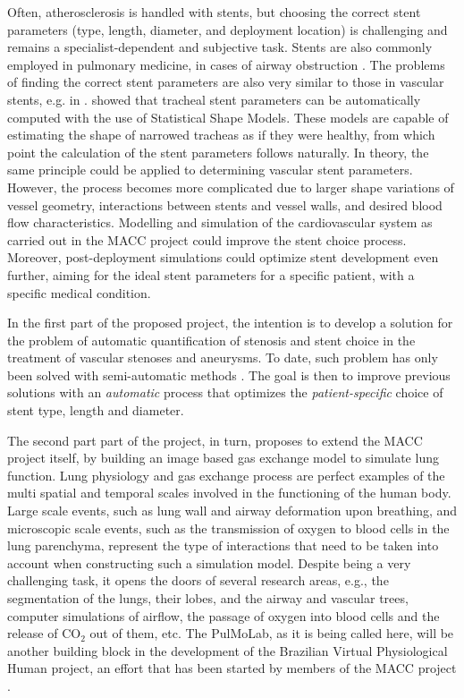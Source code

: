 Often, atherosclerosis is handled with stents, but choosing the correct stent parameters (type, length, diameter, and deployment location) is challenging and remains a specialist-dependent and subjective task. Stents are also commonly employed in pulmonary medicine, in cases of airway obstruction \citep{Chin,Freitag1,Freitag2,Freitag3,LeeP,Saito,Venuta}. The problems of finding the correct stent parameters are also very similar to those in vascular stents, e.g. in \citep{Bemmel}. \citet{Pinho:Trachea4} showed that tracheal stent parameters can be automatically computed with the use of Statistical Shape Models. These models are capable of estimating the shape of narrowed tracheas as if they were healthy, from which point the calculation of the stent parameters follows naturally. In theory, the same principle could be applied to determining vascular stent parameters. However, the process becomes more complicated due to larger shape variations of vessel geometry, interactions between stents and vessel walls, and desired blood flow characteristics. Modelling and simulation of the cardiovascular system as carried out in the MACC project could improve the stent choice process. Moreover, post-deployment simulations could optimize stent development even further, aiming for the ideal stent parameters for a specific patient, with a specific medical condition. 

In the first part of the proposed project, the intention is to develop a solution for the problem of automatic quantification of stenosis and stent choice in the treatment of vascular stenoses and aneurysms. To date, such problem has only been solved with semi-automatic methods \citep{Gremse01092011,Scherl200721,HERN-06b,Bemmel}. The goal is then to improve previous solutions with an {\em automatic} process that optimizes the {\em patient-specific} choice of stent type, length and diameter. 

The second part part of the project, in turn, proposes to extend the MACC project itself, by building an image based gas exchange model to simulate lung function. Lung physiology and gas exchange process are perfect examples of the multi spatial and temporal scales involved in the functioning of the human body. Large scale events, such as lung wall and airway deformation upon breathing, and microscopic scale events, such as the transmission of oxygen to blood cells in the lung parenchyma, represent the type of interactions that need to be taken into account when constructing such a simulation model. Despite being a very challenging task, it opens the doors of several research areas, e.g., the segmentation of the lungs, their lobes, and the airway and vascular trees, computer simulations of airflow, the passage of oxygen into blood cells and the release of CO$_2$ out of them, etc. The PulMoLab, as it is being called here, will be another building block in the development of the Brazilian Virtual Physiological Human project, an effort that has been started by members of the MACC project \citep{Blanco2010,Blanco2009a,Blanco2012,Urquiza2006,Larrabide2007}. 

